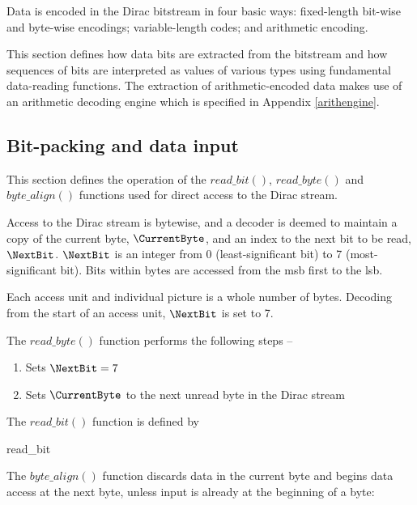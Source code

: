 
Data is encoded in the Dirac bitstream in four basic ways: fixed-length
bit-wise and byte-wise encodings; variable-length codes; and arithmetic encoding.

This section defines how data bits are extracted from the bitstream and how
sequences of bits are interpreted as values of various types using fundamental
data-reading functions. The extraction of arithmetic-encoded data makes use of
an arithmetic decoding engine which is specified in Appendix \ref{arithengine}.

\subsection{Bit-packing and data input}
\label{bitpacking}

This section defines the operation of the $read\_bit()$, $read\_byte()$ 
and $byte\_align()$ functions used for direct access to the Dirac stream.

Access to the Dirac stream is bytewise, and a decoder is deemed to maintain
a copy of the current byte, $\CurrentByte$, and an index to the next bit
to be read, $\NextBit$. $\NextBit$ is an integer from 0 (least-significant bit) to 7 
(most-significant bit). Bits within bytes are accessed from the msb first to the
lsb.

Each access unit and individual picture is a whole number of bytes. Decoding from the
start of an access unit, $\NextBit$ is set to 7.

The $read\_byte()$ function performs the following steps --
\begin{enumerate}
\item Sets $\NextBit=7$ 
\item Sets $\CurrentByte$ to the next unread byte in the Dirac stream
\end{enumerate}

The $read\_bit()$ function is defined by

\begin{pseudo}{read\_bit}{}
\bsEND
{}
\end{pseudo}

The $byte\_align()$ function discards data in the current byte and begins data access
at the next byte, unless input is already at the beginning of a byte: 

